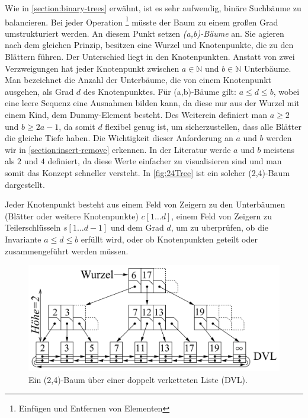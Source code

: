 Wie in \autoref{section:binary-trees} erwähnt, ist es sehr aufwendig, binäre Suchbäume zu balancieren. Bei jeder Operation \footnote{Einfügen und Entfernen von Elementen} müsste der Baum zu einem großen Grad umstrukturiert werden. An diesem Punkt setzen \textit{(a,b)-Bäume} an. Sie agieren nach dem gleichen Prinzip, besitzen eine Wurzel und Knotenpunkte, die zu den Blättern führen. Der Unterschied liegt in den Knotenpunkten. Anstatt von zwei Verzweigungen hat jeder Knotenpunkt zwischen $a \in \mathds{N}$ und $b \in \mathds{N}$ Unterbäume. Man bezeichnet die Anzahl der Unterbäume, die von einem Knotenpunkt ausgehen, als Grad $d$ des Knotenpunktes. Für (a,b)-Bäume gilt: $a \leq d \leq b$, wobei eine leere Sequenz eine Ausnahmen bilden kann, da diese nur aus der Wurzel mit einem Kind, dem Dummy-Element besteht.  Des Weiterein definiert man $a \geq 2$ und $b \geq 2 a - 1$, da somit $d$ flexibel genug ist, um sicherzustellen, dass alle Blätter die gleiche Tiefe haben. Die Wichtigkeit dieser Anforderung an $a$ und $b$ werden wir in \autoref{section:insert-remove} erkennen. In der Literatur \cite{Sanders:19} werde $a$ und $b$ meistens als $2$ und $4$ definiert, da diese Werte einfacher zu visualisieren sind und man somit das Konzept schneller versteht. In \autoref{fig:24Tree} ist ein solcher (2,4)-Baum dargestellt.
\par
Jeder Knotenpunkt besteht aus einem Feld von Zeigern zu den Unterbäumen (Blätter oder weitere Knotenpunkte) $c[1\dots d]$, einem Feld von Zeigern zu Teilerschlüsseln $s[1 \dots d-1]$ und dem Grad $d$, um zu uberprüfen, ob die Invariante $a \leq d \leq b$ erfüllt wird, oder ob Knotenpunkten geteilt oder zusammengeführt werden müssen.
\begin{figure}[hbt!]
    \begin{center}
        \includegraphics[width=0.7\linewidth]{assets/24tree.png}
        \caption{Ein (2,4)-Baum über einer doppelt verketteten Liste (DVL).\\\cite{Sanders:19}}
        \label{fig:24Tree}
    \end{center}
\end{figure}
\par
